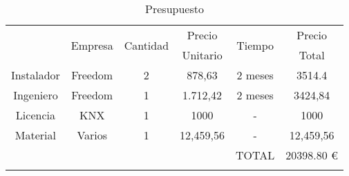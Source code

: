 \begin{center}
\begin{longtable}[H]{|c|c|c|c|c|c|}
\hline 
\rule[0mm]{0mm}{5mm}
\multirow{2}{*}{Descripción} & \multirow{2}{*}{ Empresa} &  \multirow{2}{*}{Cantidad} & Precio  & \multirow{2}{*}{Tiempo} & Precio \\
&  &  &  Unitario &  & Total\\
\hline
\hline
\endhead
\rule[0mm]{0mm}{4mm}
Instalador & Freedom & 2 & 878,63 &  2 meses & 3514.4\\
\hline
\rule[0mm]{0mm}{4mm}
Ingeniero & Freedom & 1 & 1.712,42 & 2 meses & 3424,84\\
\hline
Licencia & KNX & 1 & 1000 & - & 1000\\
\hline
Material & Varios & 1 & 12,459,56 & - & 12,459,56\\
\hline
\hline
\rule[0mm]{0mm}{4mm}
 & & & &TOTAL&20398.80 €\\
\hline 
\caption{Presupuesto}
\label{tab:tabla_presupuesto}
\end{longtable}
\end{center}